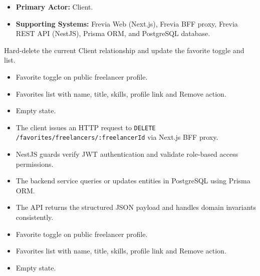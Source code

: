 
\begin{itemize}[leftmargin=1.6em,topsep=3pt,itemsep=2pt,parsep=0pt,label=$\bullet$]
    \item \textbf{Primary Actor:} Client.
    \item \textbf{Supporting Systems:} Frevia Web (Next.js), Frevia BFF proxy, Frevia REST API (NestJS), Prisma ORM, and PostgreSQL database.
\end{itemize}

\noindent Hard-delete the current Client relationship and update the favorite toggle and list.

\begin{itemize}[leftmargin=1.6em,topsep=3pt,itemsep=2pt,parsep=0pt,label=$\bullet$]
    \item Favorite toggle on public freelancer profile.
    \item Favorites list with name, title, skills, profile link and Remove action.
    \item Empty state.
\end{itemize}

\begin{itemize}[leftmargin=1.6em,topsep=3pt,itemsep=2pt,parsep=0pt,label=$\bullet$]
    \item The client issues an HTTP request to \texttt{DELETE /\allowbreak{}favorites/\allowbreak{}freelancers/\allowbreak{}:\allowbreak{}freelancerId} via Next.js BFF proxy.
    \item NestJS guards verify JWT authentication and validate role-based access permissions.
    \item The backend service queries or updates entities in PostgreSQL using Prisma ORM.
    \item The API returns the structured JSON payload and handles domain invariants consistently.
\end{itemize}

\begin{itemize}[leftmargin=1.6em,topsep=3pt,itemsep=2pt,parsep=0pt,label=$\bullet$]
    \item Favorite toggle on public freelancer profile.
    \item Favorites list with name, title, skills, profile link and Remove action.
    \item Empty state.
\end{itemize}


